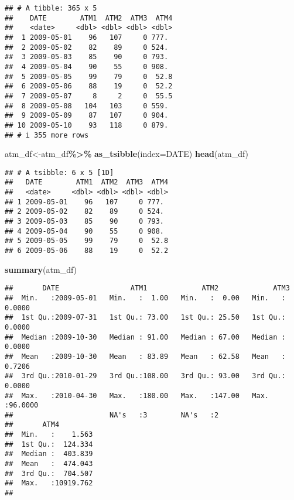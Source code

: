 \documentclass[
]{article}
\newenvironment{Shaded}{\begin{snugshade}}{\end{snugshade}}
\newcommand{\AttributeTok}[1]{\textcolor[rgb]{0.13,0.29,0.53}{#1}}
\newcommand{\FunctionTok}[1]{\textcolor[rgb]{0.13,0.29,0.53}{\textbf{#1}}}
\newcommand{\NormalTok}[1]{#1}
\newcommand{\OtherTok}[1]{\textcolor[rgb]{0.56,0.35,0.01}{#1}}
\newcommand{\SpecialCharTok}[1]{\textcolor[rgb]{0.81,0.36,0.00}{\textbf{#1}}}
\begin{document}
\begin{verbatim}
## # A tibble: 365 x 5
##    DATE        ATM1  ATM2  ATM3  ATM4
##    <date>     <dbl> <dbl> <dbl> <dbl>
##  1 2009-05-01    96   107     0 777. 
##  2 2009-05-02    82    89     0 524. 
##  3 2009-05-03    85    90     0 793. 
##  4 2009-05-04    90    55     0 908. 
##  5 2009-05-05    99    79     0  52.8
##  6 2009-05-06    88    19     0  52.2
##  7 2009-05-07     8     2     0  55.5
##  8 2009-05-08   104   103     0 559. 
##  9 2009-05-09    87   107     0 904. 
## 10 2009-05-10    93   118     0 879. 
## # i 355 more rows
\end{verbatim}

\begin{Shaded}
\begin{Highlighting}[]
\NormalTok{atm\_df}\OtherTok{\textless{}{-}}\NormalTok{atm\_df}\SpecialCharTok{\%\textgreater{}\%}
  \FunctionTok{as\_tsibble}\NormalTok{(}\AttributeTok{index=}\NormalTok{DATE)}
\FunctionTok{head}\NormalTok{(atm\_df)}
\end{Highlighting}
\end{Shaded}

\begin{verbatim}
## # A tsibble: 6 x 5 [1D]
##   DATE        ATM1  ATM2  ATM3  ATM4
##   <date>     <dbl> <dbl> <dbl> <dbl>
## 1 2009-05-01    96   107     0 777. 
## 2 2009-05-02    82    89     0 524. 
## 3 2009-05-03    85    90     0 793. 
## 4 2009-05-04    90    55     0 908. 
## 5 2009-05-05    99    79     0  52.8
## 6 2009-05-06    88    19     0  52.2
\end{verbatim}

\begin{Shaded}
\begin{Highlighting}[]
\FunctionTok{summary}\NormalTok{(atm\_df)}
\end{Highlighting}
\end{Shaded}

\begin{verbatim}
##       DATE                 ATM1             ATM2             ATM3        
##  Min.   :2009-05-01   Min.   :  1.00   Min.   :  0.00   Min.   : 0.0000  
##  1st Qu.:2009-07-31   1st Qu.: 73.00   1st Qu.: 25.50   1st Qu.: 0.0000  
##  Median :2009-10-30   Median : 91.00   Median : 67.00   Median : 0.0000  
##  Mean   :2009-10-30   Mean   : 83.89   Mean   : 62.58   Mean   : 0.7206  
##  3rd Qu.:2010-01-29   3rd Qu.:108.00   3rd Qu.: 93.00   3rd Qu.: 0.0000  
##  Max.   :2010-04-30   Max.   :180.00   Max.   :147.00   Max.   :96.0000  
##                       NA's   :3        NA's   :2                         
##       ATM4          
##  Min.   :    1.563  
##  1st Qu.:  124.334  
##  Median :  403.839  
##  Mean   :  474.043  
##  3rd Qu.:  704.507  
##  Max.   :10919.762  
## 
\end{verbatim}
\end{document}
